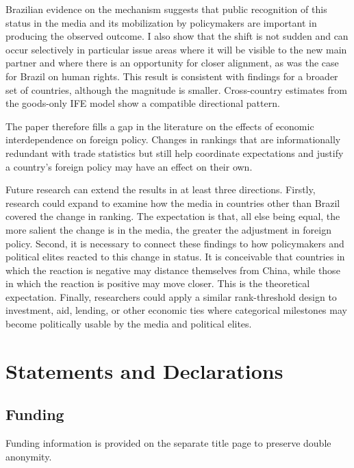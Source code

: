 \documentclass[referee,pdflatex,sn-basic]{sn-jnl}
\theoremstyle{thmstylethree}
\begin{document}
Brazilian evidence on the mechanism suggests that public recognition of this status in the media and its mobilization by policymakers are important in producing the observed outcome. I also show that the shift is not sudden and can occur selectively in particular issue areas where it will be visible to the new main partner and where there is an opportunity for closer alignment, as was the case for Brazil on human rights. This result is consistent with findings for a broader set of countries, although the magnitude is smaller. Cross-country estimates from the goods-only IFE model show a compatible directional pattern.

The paper therefore fills a gap in the literature on the effects of economic interdependence on foreign policy. Changes in rankings that are informationally redundant with trade statistics but still help coordinate expectations and justify a country's foreign policy may have an effect on their own.

Future research can extend the results in at least three directions. Firstly, research could expand to examine how the media in countries other than Brazil covered the change in ranking. The expectation is that, all else being equal, the more salient the change is in the media, the greater the adjustment in foreign policy. Second, it is necessary to connect these findings to how policymakers and political elites reacted to this change in status. It is conceivable that countries in which the reaction is negative may distance themselves from China, while those in which the reaction is positive may move closer. This is the theoretical expectation. Finally, researchers could apply a similar rank-threshold design to investment, aid, lending, or other economic ties where categorical milestones may become politically usable by the media and political elites.

\section*{Statements and Declarations}\label{statements-and-declarations}

\subsection*{Funding}\label{funding}

Funding information is provided on the separate title page to preserve double anonymity.
\end{document}
